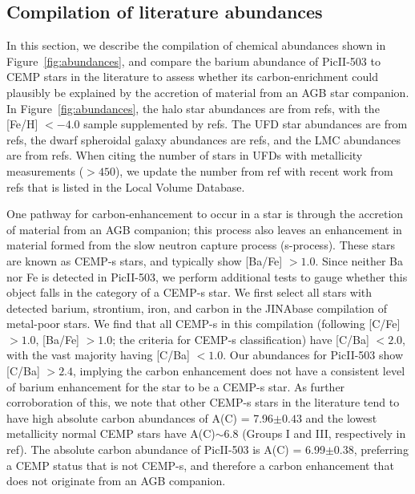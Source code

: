 \documentclass[pdflatex,sn-nature]{sn-jnl}%
\theoremstyle{thmstyleone}%
\theoremstyle{thmstyletwo}%
\theoremstyle{thmstylethree}%
\begin{document}
\subsection*{Compilation of literature abundances}

In this section, we describe the compilation of chemical abundances shown in Figure~\ref{fig:abundances}, and compare the barium abundance of PicII-503 to CEMP stars in the literature to assess whether its carbon-enrichment could plausibly be explained by the accretion of material from an AGB star companion.
In Figure~\ref{fig:abundances}, the halo star abundances are from refs\cite{ynb+13, rpt+14, ydb+21, lam+22}, with the [Fe/H] $< -4.0$ sample supplemented by refs\cite{pfb+16, fje+19, hhc+15, aag+17, aga+17, kbf+14,pc+05, gaa+20, bcs+15, cbf+11, bcs+18, pfl+15, fcj+15, cbs+13, sab+18, aag+16, mfe+22, fwc+20, nbc+19, lmj+21, prl+21, mfc+24, plc+25}. 
The UFD star abundances are from refs\cite{kmg+08, fek+09, nwg+10, nyg+10, sfm+10, fsg+10, llb+11, gnm+13, kfa+13, fsk+14, iaa+14, rk+14, fmb+16, jfs+16, fng+16, rmb+16, hsm+17, kcs+17, cfj+18, nml+18, ssf+18, jsf+19, mhs+19, hms+20, jls+20, hms+20, wvs+23, whm+23, hsl+24}, the dwarf spheroidal galaxy abundances are refs\cite{svj+24, oyc+25, svs+24, ljs+24, sks+17, hsl+23}, and the LMC abundances are from refs\cite{cml+24, ond+24}.
When citing the number of stars in UFDs with metallicity measurements ($> 450$), we update the number from ref\cite{s+19} with recent work from refs\cite{blp+23,csl+23,ccg+25, cfs+21, csf+22, fcb+19, hsl+24, hlp+24, jlp+21, sle+20, sjr+23, ccd+25} that is listed in the Local Volume Database\cite{pace+24}.

One pathway for carbon-enhancement to occur in a star is through the accretion of material from an AGB companion; this process also leaves an enhancement in material formed from the slow neutron capture process (s-process).
These stars are known as CEMP-s stars, and typically show [Ba/Fe] $> 1.0$.
Since neither Ba nor Fe is detected in PicII-503, we perform additional tests to gauge whether this object falls in the category of a CEMP-s star.
We first select all stars with detected barium, strontium, iron, and carbon in the JINAbase compilation of metal-poor stars\cite{af+18}.
We find that all CEMP-s in this compilation (following [C/Fe] $> 1.0$, [Ba/Fe] $> 1.0$; the criteria for CEMP-s classification\cite{ybp+16}) have [C/Ba] $< 2.0$, with the vast majority having [C/Ba] $< 1.0$. 
Our abundances for PicII-503 show [C/Ba] $> 2.4$, implying the carbon enhancement does not have a consistent level of barium enhancement for the star to be a CEMP-s star. 
As further corroboration of this, we note that other CEMP-s stars in the literature tend to have high absolute carbon abundances of A(C) = 7.96$\pm0.43$ and the lowest metallicity normal CEMP stars have A(C)$\sim6.8$ (Groups I and III, respectively in ref\cite{ybp+16}). 
The absolute carbon abundance of PicII-503 is A(C) = 6.99$\pm0.38$, preferring a CEMP status that is not CEMP-s, and therefore a carbon enhancement that does not originate from an AGB companion. 
\end{document}
